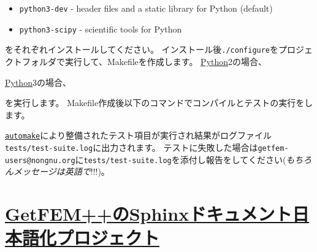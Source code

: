 \documentclass{../../style/ltjoc}
\begin{document}
\begin{itemize}
  \item \texttt{python3-dev} - header files and a static library for Python (default)
  \item \texttt{python3-scipy} - scientific tools for Python
\end{itemize}
をそれぞれインストールしてください。
インストール後\texttt{./configure}をプロジェクトフォルダで実行して、Makefileを作成します。
\href{https://www.python.org/}{Python}2の場合、
\begin{shbox}
\end{shbox}
\href{https://www.python.org/}{Python}3の場合、
\begin{shbox}
\end{shbox}
を実行します。
Makefile作成後以下のコマンドでコンパイルとテストの実行をします。
\begin{shbox}
\end{shbox}
\href{https://www.gnu.org/software/automake/}{\texttt{automake}}により整備されたテスト項目が実行され結果がログファイル\texttt{tests/test-suite.log}に出力されます。
テストに失敗した場合は\texttt{getfem-users@nongnu.org}に\texttt{tests/test-suite.log}を添付し報告をしてください(\emph{もちろんメッセージは英語で}!!!)。

\section{\href{http://www.sphinx-doc.org/ja/stable/intl.html}{GetFEM++のSphinxドキュメント日本語化プロジェクト}}
\end{document}
